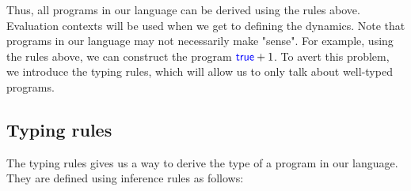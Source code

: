 \documentclass[twoside,11pt,openright]{report}
\theoremstyle{definition}
\newcommand{\Keyword}[1]{{\color{blue} \mathsf{#1}}}
\newcommand{\var}{x}
\newcommand{\expr}{e}
\newcommand{\TT}{()}
\newcommand{\Num}[1]{\overline{#1}}
\newcommand{\True}{\Keyword{true}}
\newcommand{\False}{\Keyword{false}}
\newcommand{\IfCmd}{\Keyword{if}}
\newcommand{\ThenCmd}{\Keyword{then}}
\newcommand{\ElseCmd}{\Keyword{else}}
\def\If#1then#2else#3{\IfCmd{}\;#1\;\ThenCmd{}\;#2\;\ElseCmd{}\;#3}
\newcommand{\Fst}{\Keyword{fst}\;}
\newcommand{\Tunit}{\mathsf{Unit}}
\newcommand{\Tint}{\mathbb{Z}}
\newcommand{\Tbool}{\mathbb{B}}
\newcommand{\Tprod}[2]{#1 \times #2}
\newcommand{\typ}{\tau}
\newcommand{\venv}{\Gamma}
\newcommand{\tenv}{\Xi}
\newcommand{\jdg}[4]{#1 \; | \; #2 \; \vdash #3 : #4}
\begin{document}
Thus, all programs in our language can be derived using the rules above. Evaluation contexts will be used when we get to defining the dynamics. Note that programs in our language may not necessarily make "sense". For example, using the rules above, we can construct the program $\True + 1$. To avert this problem, we introduce the typing rules, which will allow us to only talk about well-typed programs.

\subsection{Typing rules}
The typing rules gives us a way to derive the type of a program in our language. They are defined using inference rules as follows:
\end{document}
